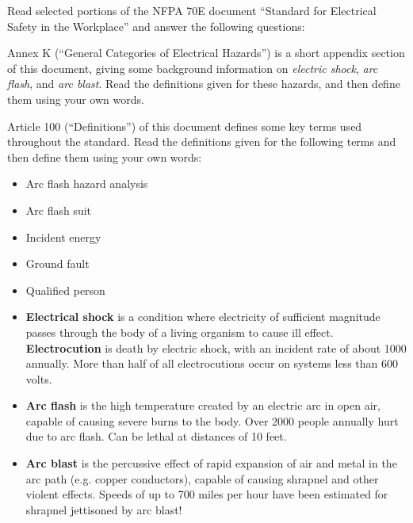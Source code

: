 

Read selected portions of the NFPA 70E document ``Standard for Electrical Safety in the Workplace'' and answer the following questions:

\vskip 10pt

Annex K (``General Categories of Electrical Hazards'') is a short appendix section of this document, giving some background information on {\it electric shock}, {\it arc flash}, and {\it arc blast}.  Read the definitions given for these hazards, and then define them using your own words.

\vskip 10pt

Article 100 (``Definitions'') of this document defines some key terms used throughout the standard.  Read the definitions given for the following terms and then define them using your own words:

\begin{itemize}
\item{} Arc flash hazard analysis
\item{} Arc flash suit
\item{} Incident energy
\item{} Ground fault
\item{} Qualified person
\end{itemize}







 






\begin{itemize}
\item{} {\bf Electrical shock} is a condition where electricity of sufficient magnitude passes through the body of a living organism to cause ill effect.  {\bf Electrocution} is death by electric shock, with an incident rate of about 1000 annually.  More than half of all electrocutions occur on systems less than 600 volts.
\item{} {\bf Arc flash} is the high temperature created by an electric arc in open air, capable of causing severe burns to the body.  Over 2000 people annually hurt due to arc flash.  Can be lethal at distances of 10 feet.
\item{} {\bf Arc blast} is the percussive effect of rapid expansion of air and metal in the arc path (e.g. copper conductors), capable of causing shrapnel and other violent effects.  Speeds of up to 700 miles per hour have been estimated for shrapnel jettisoned by arc blast!
\end{itemize}

